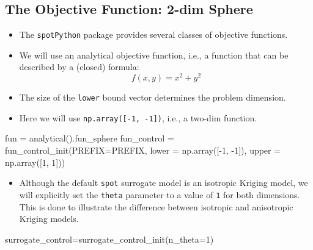 \documentclass[
  letterpaper,
  DIV=11,
  numbers=noendperiod]{scrreprt}
\newenvironment{Shaded}{\begin{snugshade}}{\end{snugshade}}
\newcommand{\DecValTok}[1]{\textcolor[rgb]{0.68,0.00,0.00}{#1}}
\newcommand{\NormalTok}[1]{\textcolor[rgb]{0.00,0.23,0.31}{#1}}
\newcommand{\OperatorTok}[1]{\textcolor[rgb]{0.37,0.37,0.37}{#1}}
\providecommand{\tightlist}{%
  \setlength{\itemsep}{0pt}\setlength{\parskip}{0pt}}\usepackage{longtable,booktabs,array}
\begin{document}
\subsection{The Objective Function: 2-dim
Sphere}\label{the-objective-function-2-dim-sphere}

\begin{itemize}
\tightlist
\item
  The \texttt{spotPython} package provides several classes of objective
  functions.
\item
  We will use an analytical objective function, i.e., a function that
  can be described by a (closed) formula: \[f(x, y) = x^2 + y^2\]
\item
  The size of the \texttt{lower} bound vector determines the problem
  dimension.
\item
  Here we will use \texttt{np.array({[}-1,\ -1{]})}, i.e., a two-dim
  function.
\end{itemize}

\begin{Shaded}
\begin{Highlighting}[]
\NormalTok{fun }\OperatorTok{=}\NormalTok{ analytical().fun\_sphere}
\NormalTok{fun\_control }\OperatorTok{=}\NormalTok{ fun\_control\_init(PREFIX}\OperatorTok{=}\NormalTok{PREFIX,}
\NormalTok{                               lower }\OperatorTok{=}\NormalTok{ np.array([}\OperatorTok{{-}}\DecValTok{1}\NormalTok{, }\OperatorTok{{-}}\DecValTok{1}\NormalTok{]),}
\NormalTok{                               upper }\OperatorTok{=}\NormalTok{ np.array([}\DecValTok{1}\NormalTok{, }\DecValTok{1}\NormalTok{]))}
\end{Highlighting}
\end{Shaded}

\begin{itemize}
\tightlist
\item
  Although the default \texttt{spot} surrogate model is an isotropic
  Kriging model, we will explicitly set the \texttt{theta} parameter to
  a value of \texttt{1} for both dimensions. This is done to illustrate
  the difference between isotropic and anisotropic Kriging models.
\end{itemize}

\begin{Shaded}
\begin{Highlighting}[]
\NormalTok{surrogate\_control}\OperatorTok{=}\NormalTok{surrogate\_control\_init(n\_theta}\OperatorTok{=}\DecValTok{1}\NormalTok{)}
\end{Highlighting}
\end{Shaded}
\end{document}
